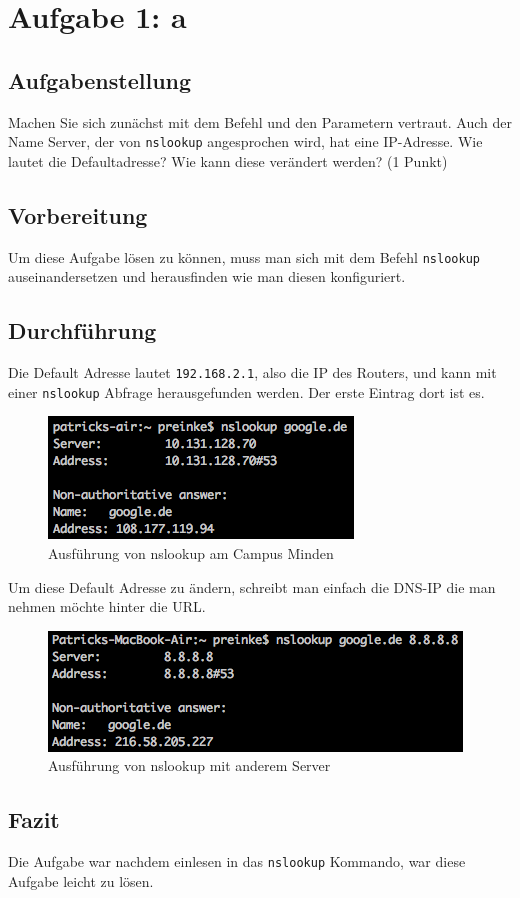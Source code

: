 \newpage
\section{Aufgabe 1: a}

\subsection{Aufgabenstellung}
Machen Sie sich zunächst mit dem Befehl und den Parametern vertraut. Auch der Name Server, der von \texttt{nslookup} angesprochen wird, hat eine IP-Adresse. Wie lautet die Defaultadresse? Wie kann diese verändert werden? (1 Punkt)

\subsection{Vorbereitung}
Um diese Aufgabe lösen zu können, muss man sich mit dem Befehl \texttt{nslookup} auseinandersetzen und herausfinden wie man diesen konfiguriert. 

\subsection{Durchführung}
Die Default Adresse lautet \texttt{192.168.2.1}, also die IP des Routers, und kann mit einer \texttt{nslookup} Abfrage herausgefunden werden. Der erste Eintrag dort ist es.

\begin{figure}[H]
	\centering
	\includegraphics[width=0.4 \linewidth]{images/11}
	\caption{Ausführung von nslookup am Campus Minden}
\end{figure}

Um diese Default Adresse zu ändern, schreibt man einfach die DNS-IP die man nehmen möchte hinter die URL.

\begin{figure}[H]
	\centering
	\includegraphics[width=0.4 \linewidth]{images/12}
	\caption{Ausführung von nslookup mit anderem Server}
\end{figure}

\subsection{Fazit}
Die Aufgabe war nachdem einlesen in das \texttt{nslookup} Kommando, war diese Aufgabe leicht zu lösen.